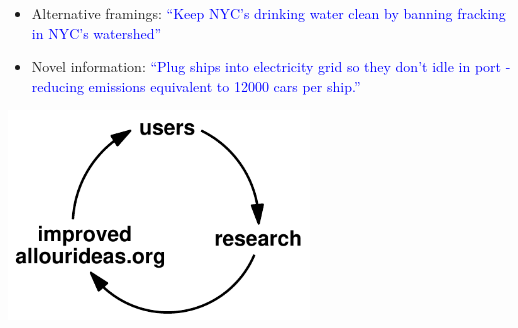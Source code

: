 \documentclass[aspectratio=169]{beamer}
\begin{document}
\begin{frame}
\frametitle{}

\begin{itemize}
\item Alternative framings: \textcolor{blue}{``Keep NYC's drinking water clean by banning fracking in NYC's watershed''}
\pause
\item Novel information: \textcolor{blue}{``Plug ships into electricity grid so they don't idle in port - reducing emissions equivalent to 12000 cars per ship.''}
\end{itemize}

\end{frame}
\begin{frame}

\begin{center}
\includegraphics[width=0.6\textwidth]{figures/virtuous_cycle}
\end{center}

\end{frame}
\end{document}
